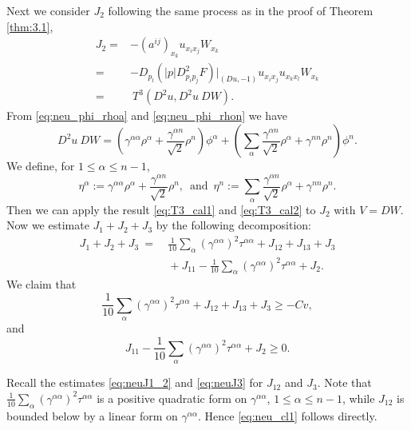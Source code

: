 \documentclass[12pt]{article}
\numberwithin{equation}{section}
\theoremstyle{plain}
\theoremstyle{definition}
\theoremstyle{remark}
\begin{document}
Next we consider $J_2$ following the same process as in the proof of Theorem \ref{thm:3.1},
\begin{equation*}
\begin{split}
    J_2 = & - (a^{ij})_{x_k} u_{x_i x_j} W_{x_k} \\
    = & -D_{p_l} \left(|p| D^2_{p_i p_j} F \right)\Big|_{(Du,-1)} u_{x_i x_j} u_{x_k x_l} W_{x_k}   \\
    = & \  T^3(D^2 u , D^2 u \  DW).
\end{split}
\end{equation*}
From \eqref{eq:neu_phi_rhoa} and \eqref{eq:neu_phi_rhon} we have 
\begin{equation*}
    D^2 u \  DW = \left( \gamma^{\alpha \alpha} \rho^{\alpha} + \frac{ \gamma^{\alpha n} }{\sqrt{2}} \rho^n \right) \phi^{\alpha} + \left( \sum_{\alpha} \frac{ \gamma^{\alpha n} }{\sqrt{2}} \rho^{\alpha}  + \gamma^{n n} \rho^n  \right) \phi^n. 
\end{equation*}
We define, for $1\leq \alpha \leq n-1$, 
\begin{equation*}
    \eta^{\alpha} := \gamma^{\alpha \alpha} \rho^{\alpha} + \frac{ \gamma^{\alpha n} }{\sqrt{2}} \rho^n,
\,\,\,\text{and}\,\,\, 
    \eta^n := \sum_{\alpha} \frac{ \gamma^{\alpha n} }{\sqrt{2}} \rho^{\alpha}  + \gamma^{n n} \rho^n .
\end{equation*}
Then we can apply the result \eqref{eq:T3_cal1} and \eqref{eq:T3_cal2} to $J_2$ with $V = DW$. Now we estimate $J_1 + J_2 +J_3$ by the following decomposition:
\begin{equation*}
\begin{split}
    J_1 + J_2 +J_3 \ = & \ \frac{1}{10}\sum_{\alpha} (\gamma^{\alpha \alpha})^2 \tau^{\alpha \alpha} +J_{12} + J_{13} + J_3\\
   & \ + J_{11} - \frac{1}{10}\sum_{\alpha} (\gamma^{\alpha \alpha})^2 \tau^{\alpha \alpha} +J_2.
\end{split}
\end{equation*}
We claim that
\begin{equation} \label{eq:neu_cl1}
    \frac{1}{10}\sum_{\alpha} (\gamma^{\alpha \alpha})^2 \tau^{\alpha \alpha} +J_{12} + J_{13} + J_3 \geq -Cv,
\end{equation}
and
\begin{equation} \label{eq:neu_cl2}
    J_{11} - \frac{1}{10}\sum_{\alpha} (\gamma^{\alpha \alpha})^2 \tau^{\alpha \alpha} +J_2 \geq 0.
\end{equation}

Recall the estimates \eqref{eq:neuJ1_2} and \eqref{eq:neuJ3} for $J_{12}$ and $J_3$. 
Note that $\frac{1}{10}\sum_{\alpha} (\gamma^{\alpha \alpha})^2 \tau^{\alpha \alpha}$ is a positive quadratic form on $\gamma^{\alpha \alpha}$, $1\leq \alpha \leq n-1$, while $J_{12}$ is bounded below by a linear form on $\gamma^{\alpha \alpha}$. Hence \eqref{eq:neu_cl1} follows directly.
\end{document}

